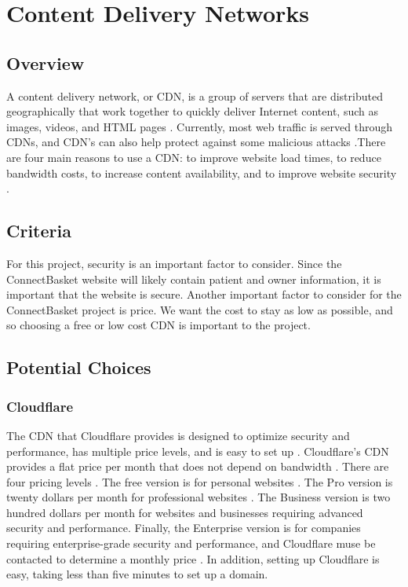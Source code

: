 \documentclass[onecolumn, draftclsnofoot,10pt, compsoc]{IEEEtran}
\begin{document}
\section{Content Delivery Networks}

\subsection{Overview}
A content delivery network, or CDN, is a group of servers that are distributed geographically that work together to quickly deliver Internet content, such as images, videos, and HTML pages \cite{cdn}. Currently, most web traffic is served through CDNs, and CDN's can also help protect against some malicious attacks \cite{cdn}.There are four main reasons to use a CDN: to improve website load times, to reduce bandwidth costs, to increase content availability, and to improve website security \cite{cdn}. 

\subsection{Criteria}
For this project, security is an important factor to consider. Since the ConnectBasket website will likely contain patient and owner information, it is important that the website is secure. Another important factor to consider for the ConnectBasket project is price. We want the cost to stay as low as possible, and so choosing a free or low cost CDN is important to the project. 


\subsection{Potential Choices}

\subsubsection{Cloudflare}
The CDN that Cloudflare provides is designed to optimize security and performance, has multiple price levels, and is easy to set up \cite{cloudflare}. Cloudflare's CDN provides a flat price per month that does not depend on bandwidth \cite{cloudflare}. There are four pricing levels \cite{cloudflare}. The free version is for personal websites \cite{cloudflare}. The Pro version is twenty dollars per month for professional websites \cite{cloudflare}. The Business version is two hundred dollars per month for websites and businesses requiring advanced security and performance\cite{cloudflare}. Finally, the Enterprise version is for companies requiring enterprise-grade security and performance, and Cloudflare muse be contacted to determine a monthly price \cite{cloudflare}. In addition, setting up Cloudflare is easy, taking less than five minutes to set up a domain.
\end{document}
